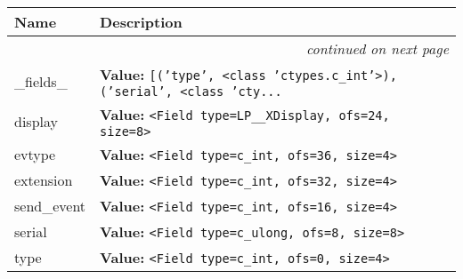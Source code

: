     \vspace{-1cm}
\hspace{\varindent}\begin{longtable}{|p{\varnamewidth}|p{\vardescrwidth}|l}
\cline{1-2}
\cline{1-2} \centering \textbf{Name} & \centering \textbf{Description}& \\
\cline{1-2}
\endhead\cline{1-2}\multicolumn{3}{r}{\small\textit{continued on next page}}\\\endfoot\cline{1-2}
\endlastfoot\raggedright \_\-f\-i\-e\-l\-d\-s\-\_\- & \raggedright \textbf{Value:} 
{\tt \texttt{[}\texttt{(}\texttt{'}\texttt{type}\texttt{'}\texttt{, }{\textless}class 'ctypes.c\_int'{\textgreater}\texttt{)}\texttt{, }\texttt{(}\texttt{'}\texttt{serial}\texttt{'}\texttt{, }{\textless}class 'cty\texttt{...}}&\\
\cline{1-2}
\raggedright d\-i\-s\-p\-l\-a\-y\- & \raggedright \textbf{Value:} 
{\tt {\textless}Field type=LP\_\_XDisplay, ofs=24, size=8{\textgreater}}&\\
\cline{1-2}
\raggedright e\-v\-t\-y\-p\-e\- & \raggedright \textbf{Value:} 
{\tt {\textless}Field type=c\_int, ofs=36, size=4{\textgreater}}&\\
\cline{1-2}
\raggedright e\-x\-t\-e\-n\-s\-i\-o\-n\- & \raggedright \textbf{Value:} 
{\tt {\textless}Field type=c\_int, ofs=32, size=4{\textgreater}}&\\
\cline{1-2}
\raggedright s\-e\-n\-d\-\_\-e\-v\-e\-n\-t\- & \raggedright \textbf{Value:} 
{\tt {\textless}Field type=c\_int, ofs=16, size=4{\textgreater}}&\\
\cline{1-2}
\raggedright s\-e\-r\-i\-a\-l\- & \raggedright \textbf{Value:} 
{\tt {\textless}Field type=c\_ulong, ofs=8, size=8{\textgreater}}&\\
\cline{1-2}
\raggedright t\-y\-p\-e\- & \raggedright \textbf{Value:} 
{\tt {\textless}Field type=c\_int, ofs=0, size=4{\textgreater}}&\\
\cline{1-2}
\end{longtable}



